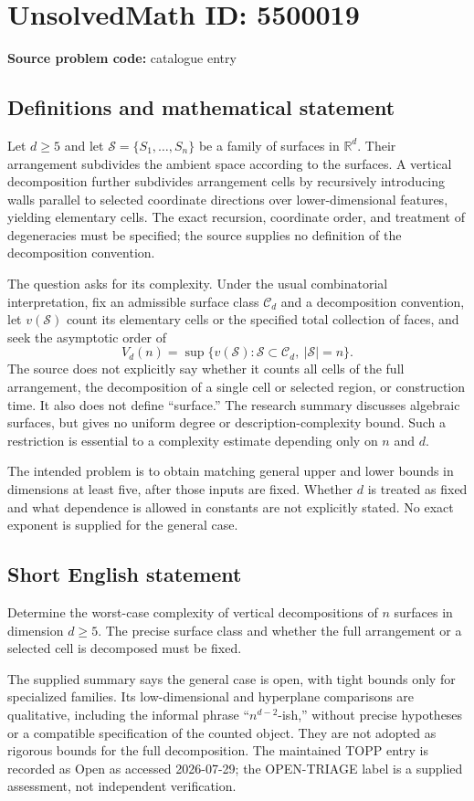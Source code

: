 \documentclass[11pt]{article}
\newcommand{\R}{\mathbb{R}}
\begin{document}
\section*{UnsolvedMath ID: 5500019}
\textbf{Source problem code:} catalogue entry
\subsection{Definitions and mathematical statement}
Let $d\ge5$ and let $\mathcal S=\{S_1,\ldots,S_n\}$ be a family of surfaces in $\R^d$. Their arrangement subdivides the ambient space according to the surfaces. A vertical decomposition further subdivides arrangement cells by recursively introducing walls parallel to selected coordinate directions over lower-dimensional features, yielding elementary cells. The exact recursion, coordinate order, and treatment of degeneracies must be specified; the source supplies no definition of the decomposition convention.

The question asks for its complexity. Under the usual combinatorial interpretation, fix an admissible surface class $\mathcal C_d$ and a decomposition convention, let $v(\mathcal S)$ count its elementary cells or the specified total collection of faces, and seek the asymptotic order of
\[
 V_d(n)=\sup\{v(\mathcal S):\mathcal S\subset\mathcal C_d,\ |\mathcal S|=n\}.
\]
The source does not explicitly say whether it counts all cells of the full arrangement, the decomposition of a single cell or selected region, or construction time. It also does not define ``surface.'' The research summary discusses algebraic surfaces, but gives no uniform degree or description-complexity bound. Such a restriction is essential to a complexity estimate depending only on $n$ and $d$.

The intended problem is to obtain matching general upper and lower bounds in dimensions at least five, after those inputs are fixed. Whether $d$ is treated as fixed and what dependence is allowed in constants are not explicitly stated. No exact exponent is supplied for the general case.
\subsection{Short English statement}
Determine the worst-case complexity of vertical decompositions of $n$ surfaces in dimension $d\ge5$. The precise surface class and whether the full arrangement or a selected cell is decomposed must be fixed.

The supplied summary says the general case is open, with tight bounds only for specialized families. Its low-dimensional and hyperplane comparisons are qualitative, including the informal phrase ``$n^{d-2}$-ish,'' without precise hypotheses or a compatible specification of the counted object. They are not adopted as rigorous bounds for the full decomposition. The maintained TOPP entry is recorded as Open as accessed 2026-07-29; the OPEN-TRIAGE label is a supplied assessment, not independent verification.
\end{document}
